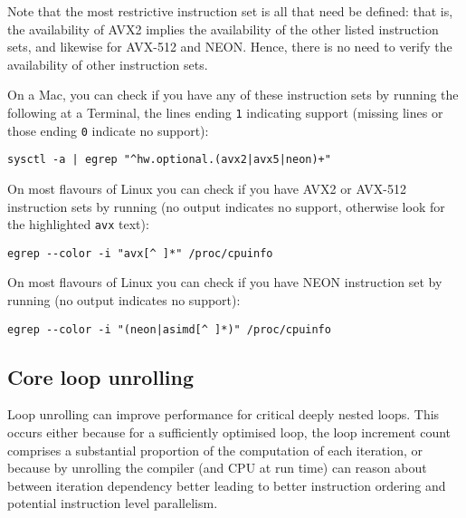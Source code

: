 \documentclass[a4paper]{article}
\begin{document}
%

Note that the most restrictive instruction set is all that need be defined: that is, the availability of AVX2 implies the availability of the other listed instruction sets, and likewise for AVX-512 and NEON.
Hence, there is no need to verify the availability of other instruction sets.

On a Mac, you can check if you have any of these instruction sets by running the following at a Terminal, the lines ending \texttt{1} indicating support (missing lines or those ending \texttt{0} indicate no support):

\begin{verbatim}
sysctl -a | egrep "^hw.optional.(avx2|avx5|neon)+"
\end{verbatim}

On most flavours of Linux you can check if you have AVX2 or AVX-512 instruction sets by running (no output indicates no support, otherwise look for the highlighted \texttt{avx} text):

\begin{verbatim}
egrep --color -i "avx[^ ]*" /proc/cpuinfo
\end{verbatim}

On most flavours of Linux you can check if you have NEON instruction set by running (no output indicates no support):

\begin{verbatim}
egrep --color -i "(neon|asimd[^ ]*)" /proc/cpuinfo
\end{verbatim}



\subsection{Core loop unrolling}
\label{apx:unroll}

Loop unrolling can improve performance for critical deeply nested loops.
This occurs either because for a sufficiently optimised loop, the loop increment count comprises a substantial proportion of the computation of each iteration, or because by unrolling the compiler (and CPU at run time) can reason about between iteration dependency better leading to better instruction ordering and potential instruction level parallelism.
\end{document}
